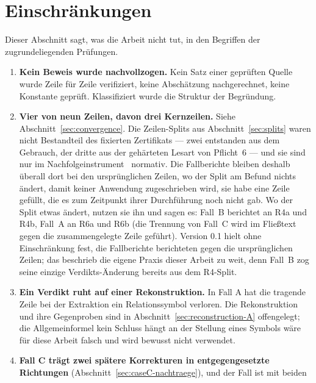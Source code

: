 \documentclass[11pt,a4paper]{article}
\theoremstyle{definition}
\begin{document}
\section{Einschränkungen}
\label{sec:limitations}

Dieser Abschnitt sagt, was die Arbeit nicht tut, in den Begriffen der
zugrundeliegenden Prüfungen.

\begin{enumerate}
\item \textbf{Kein Beweis wurde nachvollzogen.} Kein Satz einer geprüften Quelle
  wurde Zeile für Zeile verifiziert, keine Abschätzung nachgerechnet, keine
  Konstante geprüft. Klassifiziert wurde die Struktur der Begründung.
\item \textbf{Vier von neun Zeilen, davon drei Kernzeilen.} Siehe
  Abschnitt~\ref{sec:convergence}. Die Zeilen-Splits aus
  Abschnitt~\ref{sec:splits} waren nicht Bestandteil des fixierten Zertifikats
  --- zwei entstanden aus dem Gebrauch, der dritte aus der gehärteten Lesart von
  Pflicht~6 --- und sie sind nur im Nachfolgeinstrument~\cite{GeigerBCM2026}
  normativ. Die Fallberichte bleiben deshalb überall dort bei den ursprünglichen
  Zeilen, wo der Split am Befund nichts ändert, damit keiner Anwendung
  zugeschrieben wird, sie habe eine Zeile gefüllt, die es zum Zeitpunkt ihrer
  Durchführung noch nicht gab. Wo der Split etwas ändert, nutzen sie ihn und sagen
  es: Fall~B berichtet an R4a und R4b, Fall~A an R6a und R6b (die Trennung von
  Fall~C wird im Fließtext gegen die zusammengelegte Zeile geführt). Version 0.1 hielt
  ohne Einschränkung fest, die Fallberichte berichteten gegen die ursprünglichen
  Zeilen; das beschrieb die eigene Praxis dieser Arbeit zu weit, denn Fall~B zog
  seine einzige Verdikts-Änderung bereits aus dem R4-Split.
\item \textbf{Ein Verdikt ruht auf einer Rekonstruktion.} In Fall A hat die
  tragende Zeile bei der Extraktion ein Relationssymbol verloren. Die
  Rekonstruktion und ihre Gegenproben sind in
  Abschnitt~\ref{sec:reconstruction-A} offengelegt; die Allgemeinformel \glqq kein
  Schluss hängt an der Stellung eines Symbols\grqq{} wäre für diese Arbeit falsch und
  wird bewusst nicht verwendet.
\item \textbf{Fall C trägt zwei spätere Korrekturen in entgegengesetzte
  Richtungen} (Abschnitt~\ref{sec:caseC-nachtraege}), und der Fall ist mit beiden

\end{enumerate}
\end{document}
